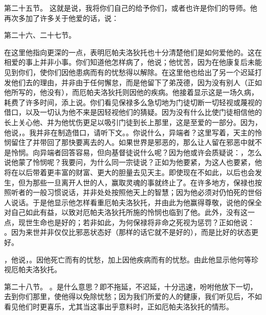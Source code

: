 第二十五节。 这就是说，我将你们自己的给予你们，或者也许是你们的导师。他再次多加了许多关于他爱的话，说：\par

第二十六、二十七节。 \par

在这里他指向更深的一点，表明厄帕夫洛狄托也十分清楚他们是如何爱他的。这在相爱的事上并非小事。你们知道他怎样病了，他说；他忧苦，因为在他康复后未能见到你们，使你们因他患病而有的忧愁得以解除。在这里他也给出了另一个迟延打发他们去的理由，并非由于任何懈怠，而是他留下了弟茂德，因为没有别人（正如他所写的，他没有），而厄帕夫洛狄托则因他的疾病。他接着显示这是一场久病，耗费了许多时间，添上说。你们看见保禄多么急切地为门徒切断一切轻视或蔑视的借口，以及一切认为他不来是因轻视他们的猜疑。因为没有什么比使门徒相信他的长上关心他、并为他忧伤更足以吸引门徒到长上那里，这是至爱的一部分。因为，他说，。我并非在制造借口，请听下文。。你说什么，异端者？这里写着，天主的怜悯留住了并带回了那快要离去的人。如果世界是邪恶的，那么让人留在邪恶中就不是怜悯。向异端者回答容易，但向基督徒说什么呢？因为他或许会质疑说：，怎么说他蒙了怜悯呢？我要问，为什么同一宗徒说？正如为他要紧，为这人也要紧，他将在以后带着更丰富的财富、更大的胆量去见天主。即使现在不如此，以后也会发生，但为那些一旦离开人世的人，赢取灵魂的事就终止了。在许多地方，保禄也按照听者的一般习惯说话，并非处处按照他天上的智慧；因为他必须对仍怕死的世俗人说话。于是他显示他怎样看重厄帕夫洛狄托，并由此为他赢得尊敬，说他的保全对自己如此有益，以致对厄帕夫洛狄托所施的怜悯也临到了他。此外，没有这一点，现世生命也是好的；若非如此，为何保禄将非命之死视为惩罚？正如他说： 。因为来世并非仅仅比邪恶状态好（那样的话它就不是好的），而是比好的状态更好。\par

，他说，。因他死亡而有的忧愁，加上因他疾病而有的忧愁。由此他显示他何等珍视厄帕夫洛狄托。\par

第二十八节。 。是什么意思？即不拖延，不迟延，十分迅速，吩咐他放下一切，去到你们那里，使他得以免除忧愁；因为我们所爱的人的健康，我们听见后，不如看见他们时更喜乐，尤其当这事出乎意料时，正如厄帕夫洛狄托的情形。\par

